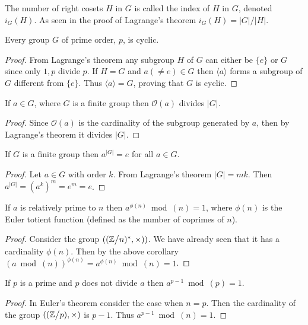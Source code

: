 \begin{remark}
  The number of right cosets $H$ in $G$ is called the index of $H$ in $G$, denoted $i_G(H)$. As seen in the proof of Lagrange's theorem $i_G(H) = |G|/|H|$.
\end{remark}
\begin{corollary}
  Every group $G$ of prime order, $p$, is cyclic.
\end{corollary}
\begin{proof}
  From Lagrange's theorem any subgroup $H$ of $G$ can either be $\{e\}$ or $G$ since only $1,p$ divide $p$. If $H=G$ and $a(\neq e)\in G$ then $ \langle a \rangle$ forms a subgroup of $G$ different from $\{e\}$. Thus $ \langle a \rangle = G$, proving that $G$ is cyclic.
\end{proof}
\begin{corollary}
  If $a\in G$, where $G$ is a finite group then $ \mathcal{O}(a)$ divides $|G|$.
\end{corollary}
\begin{proof}
  Since $ \mathcal{O}(a)$ is the cardinality of the subgroup generated by $a$, then by Lagrange's theorem it divides $|G|$.
\end{proof}
\begin{corollary}
  If $G$ is a finite group then $a^{|G|} = e$ for all $a\in G$.
\end{corollary}
\begin{proof}
  Let $a\in G$ with order $k$. From Lagrange's theorem $|G| = mk$. Then $a^{|G|} = (a^{k})^m = e^m = e$.  
\end{proof}
\begin{theorem}[Euler]
  If $a$ is relatively prime to $n$ then $a^{\phi(n)}\bmod(n) = 1$, where $\phi(n)$ is the Euler totient function (defined as the number of coprimes of $n$).
\end{theorem}
\begin{proof}
  Consider the group $((\Z\bign/n)^*, \times))$. We have already seen that it has a cardinality $\phi(n)$. Then by the above corollary $(a\bmod(n))^{\phi(n)} = a^{\phi(n)}\bmod(n) = 1$.
\end{proof}
\begin{corollary}
  If $p$ is a prime and $p$ does not divide $a$ then $a^{p-1} \bmod(p) = 1$.
\end{corollary}
\begin{proof}
  In Euler's theorem consider the case when $n=p$. Then the cardinality of the group $((\Z\bign/p),\times)$ is $p-1$. Thus $a^{p-1}\bmod(n) = 1$.
\end{proof}
